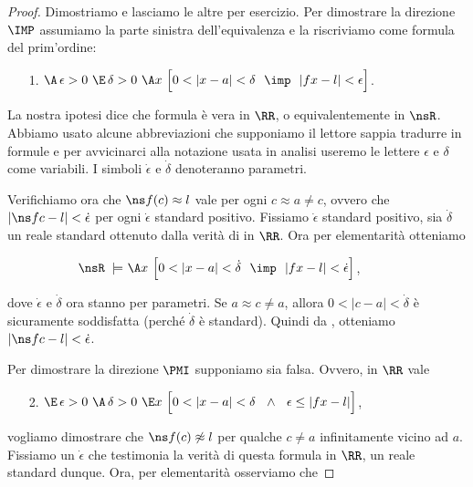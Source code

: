 \begin{proof}
Dimostriamo  e lasciamo le altre per esercizio.  Per dimostrare la direzione $\IMP$ assumiamo la parte sinistra dell'equivalenza  e la riscriviamo come formula del prim'ordine:

\begin{itemize}
\item[1.]\hspace*{9ex}$\A\,\epsilon>0\ \E\,\delta>0\ \A x\ \Big[0<|x-a|<\delta\ \ \imp\ \ |fx-l|<\epsilon\Big]$.
\end{itemize}

La nostra ipotesi dice che formula  \`e vera in $\RR$, o equivalentemente in $\nsR$. Abbiamo usato alcune abbreviazioni che supponiamo il lettore sappia tradurre in formule e per avvicinarci alla notazione usata in analisi useremo le lettere $\epsilon$ e $\delta$ come variabili. I simboli $\dot\epsilon$ e $\dot\delta$ denoteranno parametri. 

Verifichiamo ora che $\ns f(c)\approx l$ vale per ogni $c\approx a\neq c$, ovvero che $|\ns fc-l|<\dot\epsilon$ per ogni $\dot\epsilon$ standard positivo. Fissiamo $\dot\epsilon$ standard positivo, sia $\dot\delta$ un reale standard ottenuto dalla verit\`a di  in $\RR$. Ora per elementarit\`a otteniamo


\begin{itemize}
\item[]\hspace*{9ex}$\phantom{\A\,\epsilon>0\ \E\,\delta>0}\llap{$\nsR\;\models$}\ \A x\ \Big[0<|x-a|<\dot\delta\ \ \imp\ \ |fx-l|<\dot\epsilon\Big]$,
\end{itemize}

dove $\dot\epsilon$ e $\dot\delta$ ora stanno per parametri. Se  $a\approx c\neq a$, allora $0<|c-a|<\dot\delta$ \`e sicuramente soddisfatta (perch\'e $\dot\delta$ \`e standard). Quindi da , otteniamo $|\ns fc-l|<\dot\epsilon$. 

Per dimostrare la direzione $\PMI$ supponiamo  sia falsa. Ovvero, in $\RR$ vale

\begin{itemize}
\item[2.]\hspace*{9ex}$\E\,\epsilon>0\ \A\,\delta>0\ \E x\ \Big[0<|x-a|<\delta\ \ \wedge\ \ \epsilon\le |fx-l|\Big]$,
\end{itemize}

vogliamo dimostrare che $\ns f(c)\not\approx l$ per qualche $c\neq a$ infinitamente vicino ad $a$. Fissiamo un $\dot\epsilon$ che testimonia la verit\`a di questa formula in $\RR$, un reale standard dunque. Ora, per elementarit\`a osserviamo che


\end{proof}

